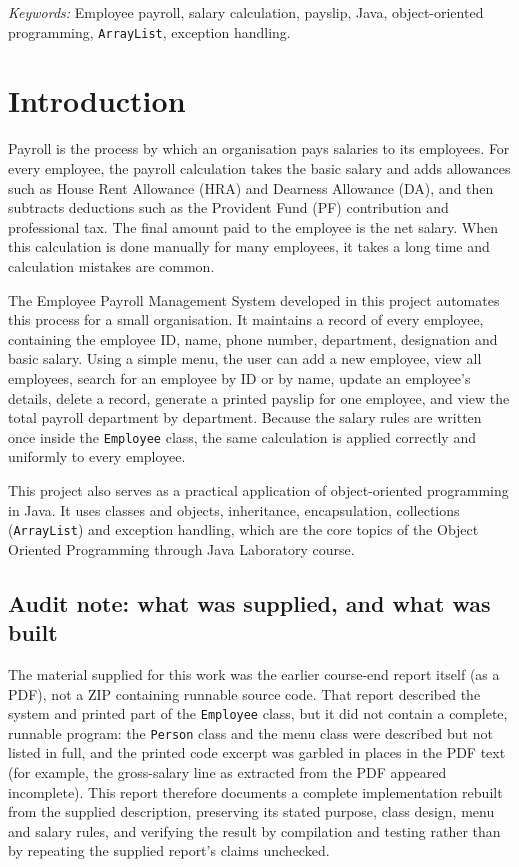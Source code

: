 \documentclass[11pt,a4paper]{article}
\begin{document}
\textit{Keywords:} Employee payroll, salary calculation, payslip, Java,
object-oriented programming, \texttt{ArrayList}, exception handling.

\section{Introduction}

Payroll is the process by which an organisation pays salaries to its
employees. For every employee, the payroll calculation takes the basic
salary and adds allowances such as House Rent Allowance (HRA) and
Dearness Allowance (DA), and then subtracts deductions such as the
Provident Fund (PF) contribution and professional tax. The final amount
paid to the employee is the net salary. When this calculation is done
manually for many employees, it takes a long time and calculation
mistakes are common.

The Employee Payroll Management System developed in this project
automates this process for a small organisation. It maintains a record
of every employee, containing the employee ID, name, phone number,
department, designation and basic salary. Using a simple menu, the user
can add a new employee, view all employees, search for an employee by
ID or by name, update an employee's details, delete a record, generate
a printed payslip for one employee, and view the total payroll
department by department. Because the salary rules are written once
inside the \texttt{Employee} class, the same calculation is applied
correctly and uniformly to every employee.

This project also serves as a practical application of
object-oriented programming in Java. It uses classes and objects,
inheritance, encapsulation, collections (\texttt{ArrayList}) and
exception handling, which are the core topics of the Object Oriented
Programming through Java Laboratory course.

\subsection{Audit note: what was supplied, and what was built}

The material supplied for this work was the earlier course-end report
itself (as a PDF), not a ZIP containing runnable source code. That
report described the system and printed part of the
\texttt{Employee} class, but it did not contain a complete, runnable
program: the \texttt{Person} class and the menu class were described
but not listed in full, and the printed code excerpt was garbled in
places in the PDF text (for example, the gross-salary line as
extracted from the PDF appeared incomplete). This report therefore
documents a complete implementation rebuilt from the supplied
description, preserving its stated purpose, class design, menu and
salary rules, and verifying the result by compilation and testing
rather than by repeating the supplied report's claims unchecked.
\end{document}
